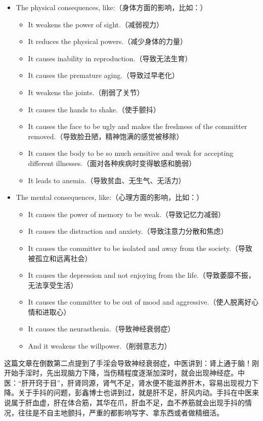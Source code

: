 \begin{itemize}
    \item The physical consequences, like:（身体方面的影响，比如：）\begin{itemize}
              \item It weakens the power of sight.（减弱视力）
              \item It reduces the physical powers.（减少身体的力量）
              \item It causes inability in reproduction.（导致无法生育）
              \item It causes the premature aging.（导致过早老化）
              \item It weakens the joints.（削弱了关节）
              \item It causes the hands to shake.（使手颤抖）
              \item It causes the face to be ugly and makes the freshness of the committer removed.（导致脸丑陋，精神饱满的感觉被移除）
              \item It causes the body to be so much sensitive and weak for accepting different illnesses.（面对各种疾病时变得敏感和脆弱）
              \item It leads to anemia.（导致贫血、无生气、无活力）
          \end{itemize}
    \item The mental consequences, like:（心理方面的影响，比如：）\begin{itemize}
              \item It causes the power of memory to be weak.（导致记忆力减弱）
              \item It causes the distraction and anxiety.（导致注意力分散和焦虑）
              \item It causes the committer to be isolated and away from the society.（导致被孤立和远离社会）
              \item It causes the depression and not enjoying from the life.（导致萎靡不振，无法享受生活）
              \item It causes the committer to be out of mood and aggressive.（使人脱离好心情和进取心）
              \item It causes the neurasthenia.（导致神经衰弱症）
              \item And it weakens the willpower.（削弱意志力）
          \end{itemize}
\end{itemize}

这篇文章在倒数第二点提到了手淫会导致神经衰弱症，中医讲到：肾上通于脑！刚开始手淫时，先出现脑力下降，当伤精程度逐渐加深时，就会出现神经症。中医：“肝开窍于目”，肝肾同源，肾气不足，肾水便不能滋养肝木，容易出现视力下降。关于手抖的问题，彭鑫博士也讲到过，就是肝不足，肝风内动。手抖在中医来说属于肝血虚，肝在体合筋，其华在爪，肝血不足，血不养筋就会出现手抖的情况，往往是不自主地颤抖，严重的都影响写字、拿东西或者做精细活。


